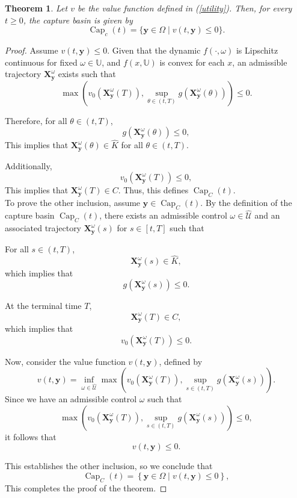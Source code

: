 \documentclass[]{interact}
\theoremstyle{plain}%
\newtheorem{theorem}{Theorem}[section]
\theoremstyle{definition}
\theoremstyle{remark}
\begin{document}
\begin{theorem}\label{thm1}
 Let \( v \) be the value function defined in (\ref{utility}). Then, for every \( t \geq 0 \), the capture basin is given by
\[ 
\operatorname{Cap}_{c}(t) = \{\mathbf{y} \in \Omega \mid v(t, \mathbf{y}) \leq 0\}.
\]
\end{theorem}

\begin{proof}
Assume \( v(t, \mathbf{y}) \leq 0 \). Given that the dynamic \( f(\cdot,\omega) \) is Lipschitz continuous for fixed $\omega\in \mathbb{U}$, and \( f(x, \mathbb{U}) \) is convex for each $x$, an admissible trajectory \( \mathbf{X}_{\mathbf{y}}^\omega \) exists such that
\[
\max \left( v_0(\mathbf{X}_{\mathbf{y}}^\omega(T)), \sup_{\theta \in (t, T)} g\left(\mathbf{X}_{\mathbf{y}}^\omega(\theta)\right) \right) \leq 0.
\]

Therefore, for all \( \theta \in (t, T) \),
\[
g\left(\mathbf{X}_{\mathbf{y}}^\omega(\theta)\right) \leq 0,
\]
This implies that \( \mathbf{X}_{\mathbf{y}}^\omega(\theta) \in \hat{K} \) for all \( \theta \in (t, T) \).

Additionally,
\[
v_0(\mathbf{X}_{\mathbf{y}}^\omega(T)) \leq 0,
\]
This implies that \( \mathbf{X}_{\mathbf{y}}^\omega(T) \in C \). Thus, this defines \( \operatorname{Cap}_{C}(t) \).\\
To prove the other inclusion, assume \( \mathbf{y} \in \operatorname{Cap}_{C}(t) \). By the definition of the capture basin \( \operatorname{Cap}_{C}(t) \), there exists an admissible control \( \omega \in \hat{\mathcal{U}} \) and an associated trajectory \( \mathbf{X}_{\mathbf{y}}^\omega(s) \) for \( s \in [t, T] \) such that

For all \( s \in (t, T) \),
\[
\mathbf{X}_{\mathbf{y}}^\omega(s) \in \hat{K},
\]
which implies that
\[
g\left(\mathbf{X}_{\mathbf{y}}^\omega(s)\right) \leq 0.
\]

At the terminal time \( T \),
\[
\mathbf{X}_{\mathbf{y}}^\omega(T) \in C,
\]
which implies that
\[
v_0\left(\mathbf{X}_{\mathbf{y}}^\omega(T)\right) \leq 0.
\]

Now, consider the value function \( v(t, \mathbf{y}) \), defined by
\[
v(t, \mathbf{y}) = \inf_{\omega \in \hat{\mathcal{U}}} \max \left( v_0\left(\mathbf{X}_{\mathbf{y}}^\omega(T)\right), \sup_{s \in (t, T)} g\left(\mathbf{X}_{\mathbf{y}}^\omega(s)\right) \right).
\]
Since we have an admissible control \( \omega \) such that
\[
\max \left( v_0\left(\mathbf{X}_{\mathbf{y}}^\omega(T)\right), \sup_{s \in (t, T)} g\left(\mathbf{X}_{\mathbf{y}}^\omega(s)\right) \right) \leq 0,
\]
it follows that
\[
v(t, \mathbf{y}) \leq 0.
\]

This establishes the other inclusion, so we conclude that
\[
\operatorname{Cap}_{C}(t) = \left\{ \mathbf{y} \in \Omega \mid v(t, \mathbf{y}) \leq 0 \right\},
\]
This completes the proof of the theorem.
\end{proof}
\end{document}

